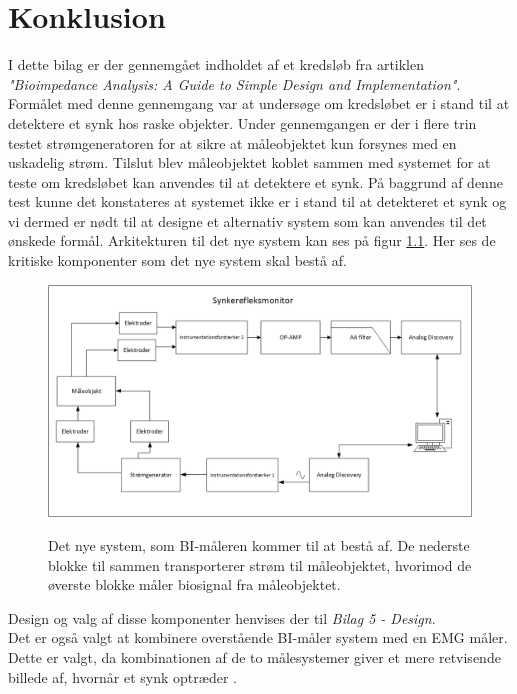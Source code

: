  



\chapter{Konklusion}

I dette bilag er der gennemgået indholdet af et kredsløb fra artiklen \textit{"Bioimpedance Analysis: A Guide to Simple Design and Implementation"}. Formålet med denne gennemgang var at undersøge om kredsløbet er i stand til at detektere et synk hos raske objekter. Under gennemgangen er der i flere trin testet strømgeneratoren for at sikre at måleobjektet kun forsynes med en uskadelig strøm. Tilslut blev måleobjektet koblet sammen med systemet for at teste om kredsløbet kan anvendes til at detektere et synk. På baggrund af denne test kunne det konstateres at systemet ikke er i stand til at detekteret et synk og vi dermed er nødt til at designe et alternativ system som kan anvendes til det ønskede formål. Arkitekturen til det nye system kan ses på figur \ref{fig:konklusiondiagram}. Her ses de kritiske komponenter som det nye system skal bestå af.

\begin{figure}[H]
\centering
{\includegraphics[width=\linewidth]
{Figure/konklusiondiagram}}
\caption{Det nye system, som BI-måleren kommer til at bestå af. De nederste blokke til sammen transporterer strøm til måleobjektet, hvorimod de øverste blokke måler biosignal fra måleobjektet. }
\label{fig:konklusiondiagram}
\end{figure}

Design og valg af disse komponenter henvises der til \textit{Bilag 5 - Design}. \\
Det er også valgt at kombinere overstående BI-måler system med en EMG måler. Dette er valgt, da kombinationen af de to målesystemer giver et mere retvisende billede af, hvornår et synk optræder \cite{Schultheiss2014}    \citep{ChristensenElisabeth;LundbakStrand2017}. 


